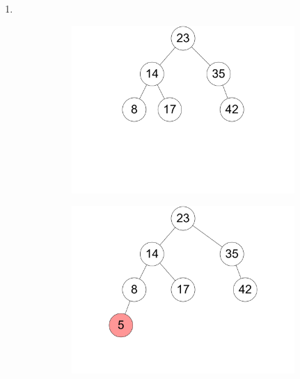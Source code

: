 \documentclass[11pt,a4paper]{article}
\begin{document}
\begin{loesung}
    \begin{enumerate}
        \item \ \\
        \begin{figure}[h!]
            \centering
            \begin{subfigure}[b]{0.23\textwidth}
                \centering
                \includegraphics[width=\textwidth]{img/3a_1}
                \caption*{}
            \end{subfigure}
            \begin{subfigure}[b]{0.23\textwidth}
                \centering
                \includegraphics[width=\textwidth]{img/3a_2}

\end{subfigure}
\end{figure}
\end{enumerate}
\end{loesung}
\end{document}
